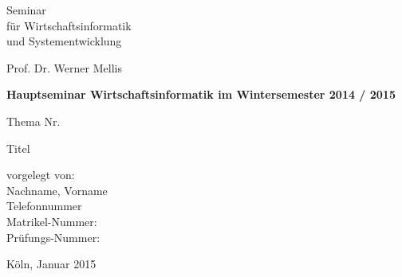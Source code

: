 \vspace{1mm}

\thispagestyle{empty}


\begin{center}
\LARGE 
Seminar\\
für Wirtschaftsinformatik\\
und Systementwicklung
\end{center}

\begin{center}
Prof. Dr. Werner Mellis
\end{center}

\vspace{21mm}
 
\begin{center}
\textbf{
    Hauptseminar Wirtschaftsinformatik
\linebreak
    im Wintersemester 2014 / 2015
}
\end{center}

\vspace{23mm}

\begin{center}
Thema Nr. 
\end{center}

\vspace{4mm}

\begin{center}
\LARGE 
Titel
\end{center}

\vspace{10mm}

\begin{center}
vorgelegt von:\\
Nachname, Vorname\\
Telefonnummer\\
Matrikel-Nummer: \\
Prüfungs-Nummer: 

\end{center}

\vspace{21mm}

\begin{center}
Köln, Januar 2015
\end{center}